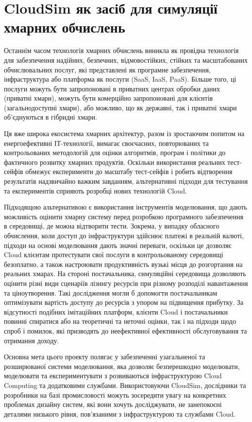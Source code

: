 \section{CloudSim як засіб для симуляції хмарних обчислень}

Останнім часом технологія хмарних обчислень виникла як провідна технологія для забезпечення надійних, безпечних, відмовостійких, стійких та масштабованих обчислювальних послуг, які представлені як програмне забезпечення, інфраструктура або платформа як послуги (SaaS, IaaS, PaaS). Більше того, ці послуги можуть бути запропоновані в приватних центрах обробки даних (приватні хмари), можуть бути комерційно запропоновані для клієнтів (загальнодоступні хмари), або можливо, що як державні, так і приватні хмари об'єднуються в гібридні хмари.

Ця вже широка екосистема хмарних архітектур, разом із зростаючим попитом на енергоефективні ІТ-технології, вимагає своєчасних, повторюваних та контрольованих методологій для оцінки алгоритмів, програм і політики до фактичного розвитку хмарних продуктів. Оскільки використання реальних тест-сейфів обмежує експерименти до масштабу тест-сейфів і робить відтворення результатів надзвичайно важким завданням, альтернативні підходи для тестування та експериментів сприяють розробці нових технологій Cloud.

Підходящою альтернативою є використання інструментів моделювання, що дають можливість оцінити хмарну систему перед розробкою програмного забезпечення в середовищі, де можна відтворити тести. Зокрема, у випадку обласного обчислення, коли доступ до інфраструктури здійснює платежі в реальній валюті, підходи на основі моделювання дають значні переваги, оскільки це дозволяє Cloud клієнтам протестувати свої послуги в контрольованому середовищі безоплатно, а також настроювати продуктивність вузькі місця до розгортання на реальних хмарах. На стороні постачальника, симуляційні середовища дозволяють оцінити різні види сценаріїв лізингу ресурсів при різному розподілі навантаження та ціноутворення. Такі дослідження могли б допомогти постачальникам оптимізувати вартість доступу до ресурсів з упором на підвищення прибутку. За відсутності подібних імітаційних платформ, клієнти Cloud і постачальники повинні спиратися або на теоретичні та неточні оцінки, так і на підходи щодо спроб і помилок, які призводять до неефективної ефективності обслуговування та отримання доходу.

Основна мета цього проекту полягає у забезпеченні узагальненої та розширюваної системи моделювання, яка дозволяє безперешкодно моделювати, моделювати та експериментувати з розвиваються інфраструктурою Cloud Computing та додатковими службами. Використовуючи CloudSim, дослідники та розробники на базі промисловості можуть зосередити увагу на конкретних проблемах дизайну систем, які вони хочуть досліджувати, не занепокоєні деталями низького рівня, пов'язаними з інфраструктурою та службами Cloud.

